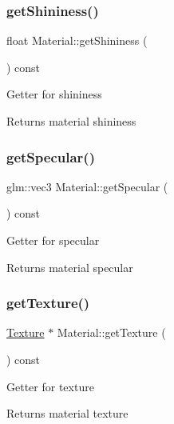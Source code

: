 \subsubsection{\texorpdfstring{get\+Shininess()}{getShininess()}}
{\footnotesize\ttfamily float Material\+::get\+Shininess (\begin{DoxyParamCaption}{ }\end{DoxyParamCaption}) const}

Getter for shininess \begin{DoxyReturn}{Returns}
material shininess 
\end{DoxyReturn}
\mbox{\label{classMaterial_a886ca5380613e1613bf8f2075511b460}} 
\subsubsection{\texorpdfstring{get\+Specular()}{getSpecular()}}
{\footnotesize\ttfamily glm\+::vec3 Material\+::get\+Specular (\begin{DoxyParamCaption}{ }\end{DoxyParamCaption}) const}

Getter for specular \begin{DoxyReturn}{Returns}
material specular 
\end{DoxyReturn}
\mbox{\label{classMaterial_a1e0cbeb8397c883361f8f9e4af9497ad}} 
\subsubsection{\texorpdfstring{get\+Texture()}{getTexture()}}
{\footnotesize\ttfamily \hyperlink{classTexture}{Texture} $\ast$ Material\+::get\+Texture (\begin{DoxyParamCaption}{ }\end{DoxyParamCaption}) const}

Getter for texture \begin{DoxyReturn}{Returns}
material texture 
\end{DoxyReturn}
\mbox{\label{classMaterial_af799317a93672f4ffb2fed70bdb7e607}} 
